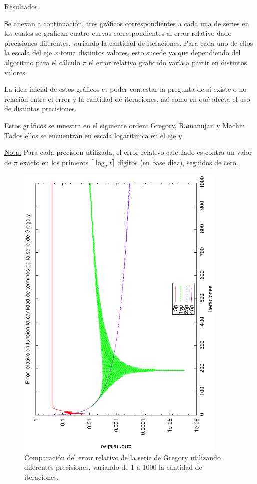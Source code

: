 \begin{section}{Resultados}
	\VSP
	
	Se anexan a continuación, tres gráficos correspondientes a cada una de series en los cuales se grafican cuatro curvas correspondientes al error relativo dado precisiones diferentes, variando la cantidad de iteraciones. Para cada uno de ellos la escala del eje $x$ toma distintos valores, esto sucede ya que dependiendo del algoritmo para el cálculo $\pi$ el error relativo graficado varía a partir en distintos valores.
	
	La idea inicial de estos gráficos es poder contestar la pregunta de si existe o no relación entre el error y la cantidad de iteraciones, así como en qué afecta el uso de distintas precisiones.
	
	Estos gráficos se muestra en el siguiente orden: Gregory, Ramanujan y Machin. Todos ellos se encuentran en escala logarítmica en el eje $y$

	\underline{Nota:} Para cada precisión utilizada, el error relativo calculado es contra un valor de $\pi$ exacto en los primeros $\lceil\log_2{t}\rceil$ dígitos (en base diez), seguidos de cero.

	\begin{figure}[H]
	  \centering
		\includegraphics[width=10cm,angle=-90]{graficos/gregory_1a1000it.eps}
	  \caption{Comparación del error relativo de la serie de Gregory utilizando diferentes precisiones, variando de 1 a 1000 la cantidad de iteraciones.}
	  \label{fig:gregory_1000it}
	\end{figure}
	

\end{section}
